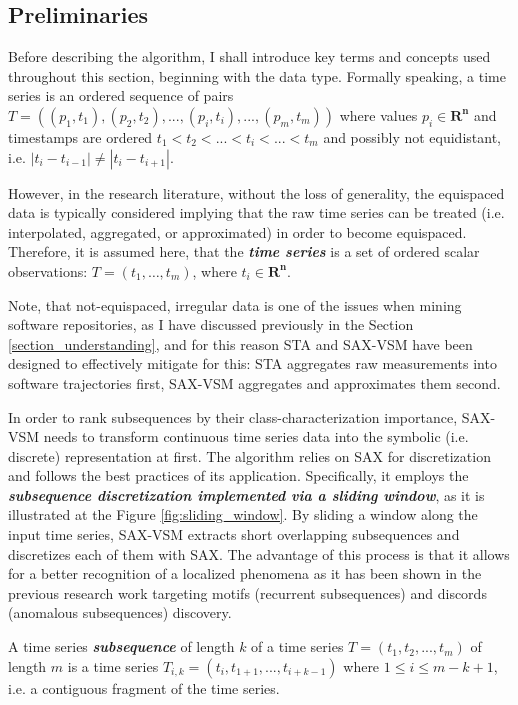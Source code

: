 \subsection{Preliminaries}
Before describing the algorithm, I shall introduce key terms and concepts used throughout this section, beginning with the data type.
Formally speaking, a time series is an ordered sequence of pairs 
\mbox{$T=((p_{1},t_{1}),(p_{2},t_{2}),...,(p_{i},t_{i}),...,(p_{m},t_{m}))$}
where values $p_{i} \in \mathbf{R^{n}}$ and timestamps are ordered $t_{1} < t_{2} < ... < t_{i} <...<t_{m}$ 
and possibly not equidistant, i.e. $|t_{i}-t_{i-1}| \neq |t_{i}-t_{i+1}|$.

However, in the research literature, without the loss of generality, the equispaced data is typically considered implying that the 
raw time series can be treated (i.e. interpolated, aggregated, or approximated) in order to become equispaced. 
Therefore, it is assumed here, that the \textbf{\textit{time series}} is a set of ordered scalar observations: 
$T = ( t_{1},\dots,t_{m} )$, where $t_{i} \in \mathbf{R^{n}}$.

Note, that not-equispaced, irregular data is one of the issues when mining software repositories, as I have discussed previously in 
the Section \ref{section_understanding}, and for this reason STA and SAX-VSM have been designed to effectively mitigate for this: 
STA aggregates raw measurements into software trajectories first, SAX-VSM aggregates and approximates them second. 

In order to rank subsequences by their class-characterization importance, SAX-VSM needs to transform continuous time series data 
into the symbolic (i.e. discrete) representation at first. The algorithm relies on SAX \cite{citeulike:2821475} for discretization and follows 
the best practices of its application. Specifically, it employs the \textit{\textbf{subsequence discretization implemented via a sliding window}}, 
as it is illustrated at the Figure \ref{fig:sliding_window}. By sliding a window along the input time series, SAX-VSM extracts short 
overlapping subsequences and discretizes each of them with SAX. The advantage of this process is that it allows for a better recognition of 
a localized phenomena as it has been shown in the previous research work targeting motifs (recurrent subsequences) \cite{citeulike:3977965} 
and discords (anomalous subsequences) \cite{citeulike:3175749} discovery. 

A time series \textbf{\textit{subsequence}} of length $k$ of a time series $T = (t_{1}, t_{2},...,t_{m})$ of length $m$ is a time 
series $T_{i,k} = (t_{i},t_{1+1},...,t_{i+k-1})$  where $1 \leq i \leq m - k + 1$, i.e. a contiguous fragment of the time series.


